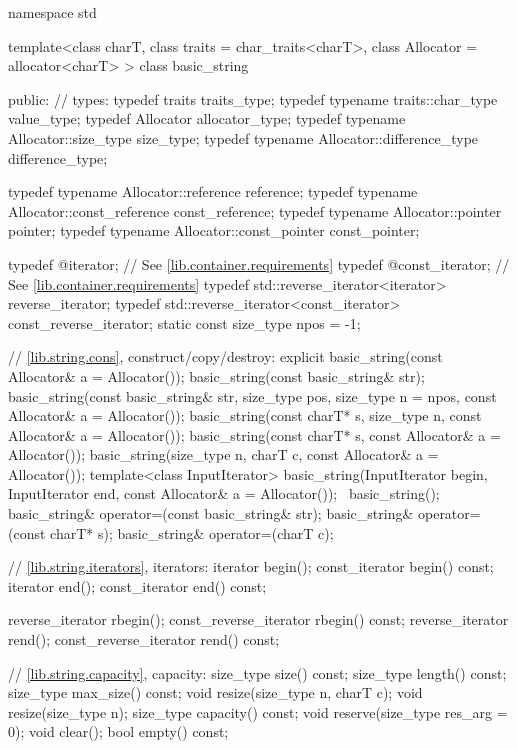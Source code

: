 %
\begin{codeblock}
namespace std {
  template<class charT, class traits = char_traits<charT>,
           class Allocator = allocator<charT> >
  class basic_string {
  public:
    // types:
    typedef          traits                     traits_type;
    typedef typename traits::char_type          value_type;
    typedef          Allocator                  allocator_type;
    typedef typename Allocator::size_type       size_type;
    typedef typename Allocator::difference_type difference_type;

    typedef typename Allocator::reference       reference;
    typedef typename Allocator::const_reference const_reference;
    typedef typename Allocator::pointer         pointer;
    typedef typename Allocator::const_pointer   const_pointer;

    typedef @\impdef@             iterator;          // See \ref{lib.container.requirements}
    typedef @\impdef@             const_iterator;    // See \ref{lib.container.requirements}
    typedef std::reverse_iterator<iterator> reverse_iterator;
    typedef std::reverse_iterator<const_iterator> const_reverse_iterator;
    static const size_type npos = -1;

    // \ref{lib.string.cons}, construct/copy/destroy:
    explicit basic_string(const Allocator& a = Allocator());
    basic_string(const basic_string& str);
    basic_string(const basic_string& str, size_type pos, size_type n = npos,
                 const Allocator& a = Allocator());
    basic_string(const charT* s,
                 size_type n, const Allocator& a = Allocator());
    basic_string(const charT* s, const Allocator& a = Allocator());
    basic_string(size_type n, charT c, const Allocator& a = Allocator());
    template<class InputIterator>
      basic_string(InputIterator begin, InputIterator end,
                   const Allocator& a = Allocator());
   ~basic_string();
    basic_string& operator=(const basic_string& str);
    basic_string& operator=(const charT* s);
    basic_string& operator=(charT c);

    // \ref{lib.string.iterators}, iterators:
    iterator       begin();
    const_iterator begin() const;
    iterator       end();
    const_iterator end() const;

    reverse_iterator       rbegin();
    const_reverse_iterator rbegin() const;
    reverse_iterator       rend();
    const_reverse_iterator rend() const;

    // \ref{lib.string.capacity}, capacity:
    size_type size() const;
    size_type length() const;
    size_type max_size() const;
    void resize(size_type n, charT c);
    void resize(size_type n);
    size_type capacity() const;
    void reserve(size_type res_arg = 0);
    void clear();
    bool empty() const;

}}
\end{codeblock}

